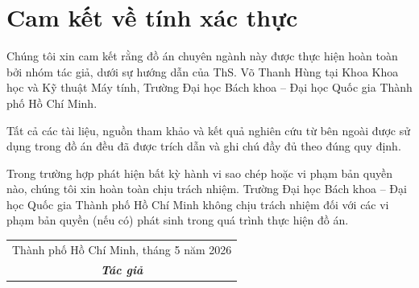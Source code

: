 
 
 


    

\chapter*{Cam kết về tính xác thực}

Chúng tôi xin cam kết rằng đồ án chuyên ngành này được thực hiện hoàn toàn bởi nhóm tác giả, dưới sự hướng dẫn của ThS. Võ Thanh Hùng tại Khoa Khoa học và Kỹ thuật Máy tính, Trường Đại học Bách khoa – Đại học Quốc gia Thành phố Hồ Chí Minh.

\noindent Tất cả các tài liệu, nguồn tham khảo và kết quả nghiên cứu từ bên ngoài được sử dụng trong đồ án đều đã được trích dẫn và ghi chú đầy đủ theo đúng quy định.

\noindent Trong trường hợp phát hiện bất kỳ hành vi sao chép hoặc vi phạm bản quyền nào, chúng tôi xin hoàn toàn chịu trách nhiệm. Trường Đại học Bách khoa – Đại học Quốc gia Thành phố Hồ Chí Minh không chịu trách nhiệm đối với các vi phạm bản quyền (nếu có) phát sinh trong quá trình thực hiện đồ án.

\vspace{2cm}

\begin{flushright}
\begin{tabular}{c}
    Thành phố Hồ Chí Minh, tháng 5 năm 2026 \\
    \textit{\textbf{Tác giả}}
\end{tabular}
\end{flushright}
